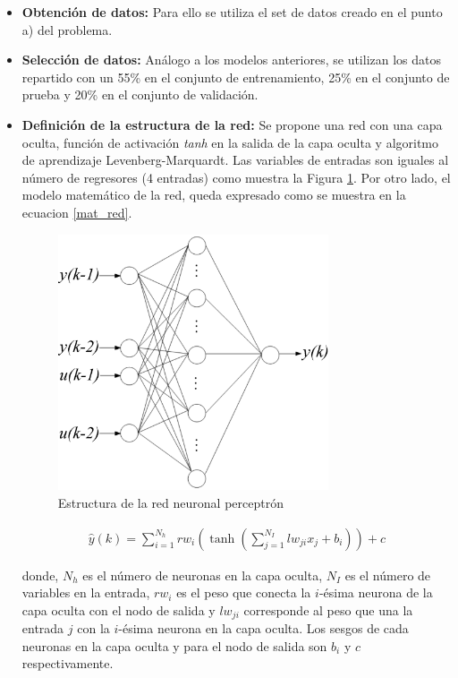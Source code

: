 \documentclass[12pt]{article}
\begin{document}
\begin{itemize}
	\item \textbf{Obtención de datos:} Para ello se utiliza el set de datos creado en el punto a) del problema.
	\item \textbf{Selección de datos:} Análogo a los modelos anteriores, se utilizan los datos repartido con un 55\% en el conjunto de entrenamiento, 25\% en el conjunto de prueba y 20\% en el conjunto de validación.
	\item \textbf{Definición de la estructura de la red:} Se propone una red con una capa oculta, función de activación \textit{tanh} en la salida de la capa oculta y algoritmo de aprendizaje Levenberg-Marquardt. Las variables de entradas son iguales al número de regresores (4 entradas) como muestra la Figura \ref{estred}. Por otro lado, el modelo matemático de la red, queda expresado como se muestra en la ecuacion \ref{mat_red}.
	\begin{figure}
		\centering
		\includegraphics[width=8cm]{imag/redes/estructura.eps}
		\caption{Estructura de la red neuronal perceptrón}
		\label{estred}
	\end{figure}
	\begin{align}
	\hat{y}(k) = \sum_{i=1}^{N_h} rw_i \left( \tanh\left(\sum_{j=1}^{N_I} lw_{ji} x_j + b_i\right)\right) + c
	\label{mat_red}
	\end{align}
	
	donde, $N_h$ es el número de neuronas en la capa oculta, $N_I$ es el número de variables en la entrada, $rw_i$ es el peso que conecta la $i$-ésima neurona de la capa oculta con el nodo de salida y $lw_{ji}$ corresponde al peso que una la entrada $j$ con la $i$-ésima neurona en la capa oculta. Los sesgos de cada neuronas en la capa oculta y para el nodo de salida son $b_i$ y $c$ respectivamente.
	

\end{itemize}
\end{document}
